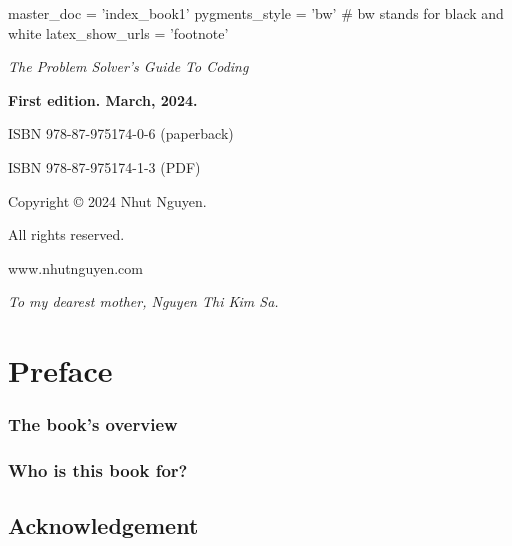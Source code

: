 master_doc = 'index_book1'
pygments_style = 'bw' # bw stands for black and white
latex_show_urls = 'footnote'


\usepackage[paperwidth=7.5in,paperheight=9.25in]{geometry}

\date{March, 2024}
% 
\frontmatter


\textit{The Problem Solver's Guide To Coding} 

\textbf{First edition. March, 2024.} 

ISBN 978-87-975174-0-6 (paperback)

ISBN 978-87-975174-1-3 (PDF)


Copyright © 2024 Nhut Nguyen.

All rights reserved.

www.nhutnguyen.com

\newpage
\begin{center}
    \textit{To my dearest mother, Nguyen Thi Kim Sa.}
\end{center}

\sphinxstepscope



\chapter*{Preface}

\subsection*{The book’s overview}

\subsection*{Who is this book for?}

\section*{Acknowledgement}

\newpage




